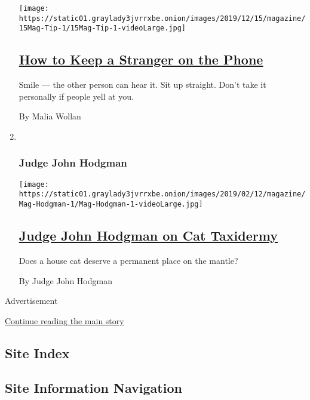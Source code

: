 \begin{enumerate}
  \texttt{[image: https://static01.graylady3jvrrxbe.onion/images/2019/12/15/magazine/15Mag-Tip-1/15Mag-Tip-1-videoLarge.jpg]}

  \hypertarget{how-to-keep-a-stranger-on-the-phone}{%
  \subsection{\texorpdfstring{\href{/2019/12/11/magazine/how-to-keep-a-stranger-on-the-phone.html}{How
  to Keep a Stranger on the
  Phone}}{How to Keep a Stranger on the Phone}}\label{how-to-keep-a-stranger-on-the-phone}}

  Smile --- the other person can hear it. Sit up straight. Don't take it
  personally if people yell at you.

  By Malia Wollan
\item ~
  \hypertarget{judge-john-hodgman}{%
  \subsubsection{Judge John Hodgman}\label{judge-john-hodgman}}

  \texttt{[image: https://static01.graylady3jvrrxbe.onion/images/2019/02/12/magazine/Mag-Hodgman-1/Mag-Hodgman-1-videoLarge.jpg]}

  \hypertarget{judge-john-hodgman-on-cat-taxidermy}{%
  \subsection{\texorpdfstring{\href{/2019/12/12/magazine/judge-john-hodgman-on-cat-taxidermy.html}{Judge
  John Hodgman on Cat
  Taxidermy}}{Judge John Hodgman on Cat Taxidermy}}\label{judge-john-hodgman-on-cat-taxidermy}}

  Does a house cat deserve a permanent place on the mantle?

  By Judge John Hodgman
\end{enumerate}

Advertisement

\protect\hyperlink{after-mid1}{Continue reading the main story}

\hypertarget{site-index}{%
\subsection{Site Index}\label{site-index}}

\hypertarget{site-information-navigation}{%
\subsection{Site Information
Navigation}\label{site-information-navigation}}

